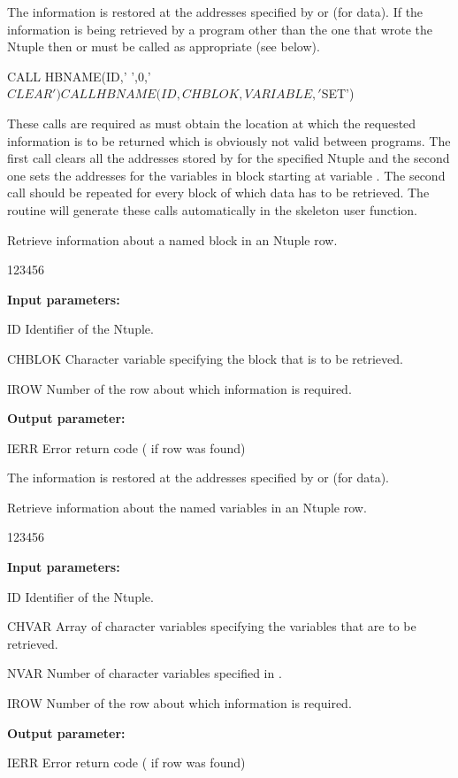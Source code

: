 The information is restored at the addresses specified by 
or  (for  data).
If the information is being retrieved by a program other than the
one that wrote the Ntuple then 
or  must be called as appropriate (see below).
\begin{XMP}
      CALL HBNAME(ID,' ',0,'$CLEAR')
      CALL HBNAME(ID,CHBLOK,VARIABLE,'$SET')
\end{XMP}
\Rind[HBNAME]{}
\Rind[HBNAMC]{}
These calls are required as  must obtain the location
at which the requested information is to be returned which is
obviously not valid between programs.
The first call clears all the addresses stored by 
for the specified Ntuple and the second one sets the
addresses for the variables in block  starting at variable
. The second call should be repeated for every block of
which data has to be retrieved. The routine  will generate
these calls automatically in the skeleton user function.

 
\Action

Retrieve information about a named block in an Ntuple row.
 
\begin{DLtt}{123456}
\item[{\rm\bf Input parameters:}]
\item[ID] Identifier of the Ntuple.
\item[CHBLOK]Character variable specifying the block that is to be
retrieved.
\item[IROW] Number of the row about which information is required.
\item[{\rm\bf Output parameter:}]
\item[IERR] Error return code ( if row was found)
\end{DLtt}

The information is restored at the addresses specified by 
or  (for  data).

 
\Action

Retrieve information about the named variables in an Ntuple row.
 
\begin{DLtt}{123456}
\item[{\rm\bf Input parameters:}]
\item[ID] Identifier of the Ntuple.
\item[CHVAR] Array of character variables specifying the variables
             that are to be retrieved.
\item[NVAR]  Number of character variables specified in .
\item[IROW] Number of the row about which information is required.
\newpage%
\item[{\rm\bf Output parameter:}]
\item[IERR] Error return code ( if row was found)
\end{DLtt}

